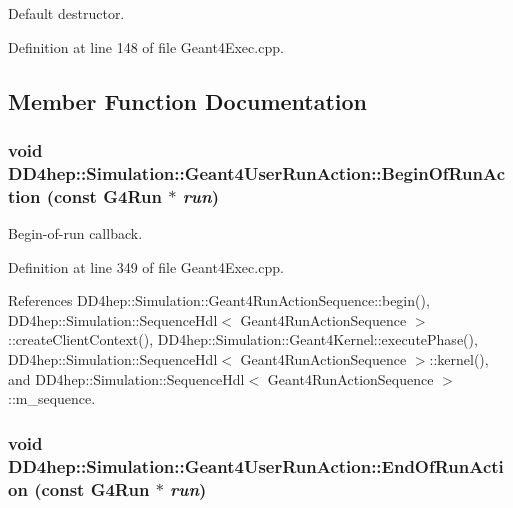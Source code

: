 Default destructor. 

Definition at line 148 of file Geant4Exec.cpp.

\subsection{Member Function Documentation}
\hypertarget{class_d_d4hep_1_1_simulation_1_1_geant4_user_run_action_a42955d00dd5a101ec3e9594645eac6e5}{
\subsubsection[{BeginOfRunAction}]{\setlength{\rightskip}{0pt plus 5cm}void DD4hep::Simulation::Geant4UserRunAction::BeginOfRunAction (const G4Run $\ast$ {\em run})}}
\label{class_d_d4hep_1_1_simulation_1_1_geant4_user_run_action_a42955d00dd5a101ec3e9594645eac6e5}


Begin-\/of-\/run callback. 

Definition at line 349 of file Geant4Exec.cpp.

References DD4hep::Simulation::Geant4RunActionSequence::begin(), DD4hep::Simulation::SequenceHdl$<$ Geant4RunActionSequence $>$::createClientContext(), DD4hep::Simulation::Geant4Kernel::executePhase(), DD4hep::Simulation::SequenceHdl$<$ Geant4RunActionSequence $>$::kernel(), and DD4hep::Simulation::SequenceHdl$<$ Geant4RunActionSequence $>$::m\_\-sequence.\hypertarget{class_d_d4hep_1_1_simulation_1_1_geant4_user_run_action_acb9977f8d385a4f6523617dafea602bb}{
\subsubsection[{EndOfRunAction}]{\setlength{\rightskip}{0pt plus 5cm}void DD4hep::Simulation::Geant4UserRunAction::EndOfRunAction (const G4Run $\ast$ {\em run})}}
\label{class_d_d4hep_1_1_simulation_1_1_geant4_user_run_action_acb9977f8d385a4f6523617dafea602bb}


